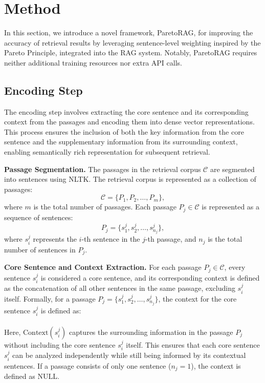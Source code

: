 
\section{Method}
In this section, we introduce a novel framework, ParetoRAG, for improving the accuracy of retrieval results by leveraging sentence-level weighting inspired by the Pareto Principle, integrated into the RAG system. Notably, ParetoRAG requires neither additional training resources nor extra API calls.

\subsection{Encoding Step}
The encoding step involves extracting the core sentence and its corresponding context from the passages and encoding them into dense vector representations. This process ensures the inclusion of both the key information from the core sentence and the supplementary information from its surrounding context, enabling semantically rich representation for subsequent retrieval.

\textbf{Passage Segmentation. }The passages in the retrieval corpus $\mathcal{C}$ are segmented into sentences using NLTK. The retrieval corpus is represented as a collection of passages:
\[
\mathcal{C} = \{P_1, P_2, \dots, P_m\},
\]
where $m$ is the total number of passages. Each passage $P_j \in \mathcal{C}$ is represented as a sequence of sentences:
\[
P_j = \{s_1^j, s_2^j, \dots, s_{n_j}^j\},
\]
where $s_i^j$ represents the $i$-th sentence in the $j$-th passage, and $n_j$ is the total number of sentences in $P_j$.

\textbf{Core Sentence and Context Extraction. }For each passage $P_j \in \mathcal{C}$, every sentence $s_i^j$ is considered a core sentence, and its corresponding context is defined as the concatenation of all other sentences in the same passage, excluding $s_i^j$ itself. Formally, for a passage $P_j = \{s_1^j, s_2^j, \dots, s_{n_j}^j\}$, the context for the core sentence $s_i^j$ is defined as:
\\[\bigskipamount]
\\[\bigskipamount]
Here, $\text{Context}(s_i^j)$ captures the surrounding information in the passage $P_j$ without including the core sentence $s_i^j$ itself. This ensures that each core sentence $s_i^j$ can be analyzed independently while still being informed by its contextual sentences. If a passage consists of only one sentence ($n_j = 1$), the context is defined as $\text{NULL}$.

